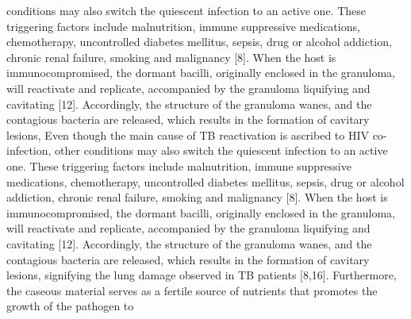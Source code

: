 \documentclass{article}
\begin{document}
conditions may also switch the quiescent infection to an active one. These triggering factors include malnutrition, immune suppressive medications, chemotherapy, uncontrolled diabetes mellitus, sepsis, drug or alcohol addiction, chronic renal failure, smoking and malignancy [8]. When the host is immunocompromised, the dormant bacilli, originally enclosed in the granuloma, will reactivate and replicate, accompanied by the granuloma liquifying and cavitating [12]. Accordingly, the structure of the granuloma wanes, and the contagious bacteria are released, which results in the formation of cavitary lesions, Even though the main cause of TB reactivation is ascribed to HIV co-infection, other conditions may also switch the quiescent infection to an active one. These triggering factors include malnutrition, immune suppressive medications, chemotherapy, uncontrolled diabetes mellitus, sepsis, drug or alcohol addiction, chronic renal failure, smoking and malignancy [8]. When the host is immunocompromised, the dormant bacilli, originally enclosed in the granuloma, will reactivate and replicate, accompanied by the granuloma liquifying and cavitating [12]. Accordingly, the structure of the granuloma wanes, and the contagious bacteria are released, which results in the formation of cavitary lesions, signifying the lung damage observed in TB patients [8,16]. Furthermore, the caseous material serves as a fertile source of nutrients that promotes the growth of the pathogen to
\end{document}
